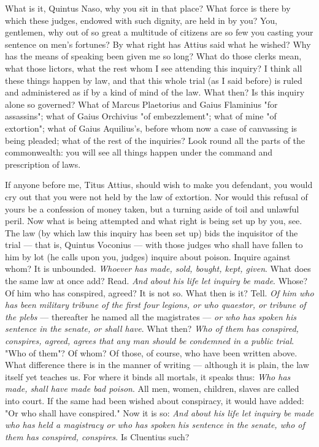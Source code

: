  What is it, Quintus Naso, why you sit in that place? What force is there by which these judges, endowed with such dignity, are held in by you? You, gentlemen, why out of so great a multitude of citizens are so few you casting your sentence on men's fortunes? By what right has Attius said what he wished? Why has the means of speaking been given me so long? What do those clerks mean, what those lictors, what the rest whom I see attending this inquiry? I think all these things happen by law, and that this whole trial (as I said before) is ruled and administered as if by a kind of mind of the law. What then? Is this inquiry alone so governed? What of Marcus Plaetorius and Gaius Flaminius "for assassins"; what of Gaius Orchivius "of embezzlement"; what of mine "of extortion"; what of Gaius Aquilius's, before whom now a case of canvassing is being pleaded; what of the rest of the inquiries? Look round all the parts of the commonwealth: you will see all things happen under the command and prescription of laws.

 If anyone before me, Titus Attius, should wish to make you defendant, you would cry out that you were not held by the law of extortion. Nor would this refusal of yours be a confession of money taken, but a turning aside of toil and unlawful peril. Now what is being attempted and what right is being set up by you, see. The law (by which law this inquiry has been set up) bids the inquisitor of the trial --- that is, Quintus Voconius --- with those judges who shall have fallen to him by lot (he calls upon you, judges) inquire about poison. Inquire against whom? It is unbounded. \textit{Whoever has made, sold, bought, kept, given}. What does the same law at once add? Read. \textit{And about his life let inquiry be made}. Whose? Of him who has conspired, agreed? It is not so. What then is it? Tell. \textit{Of him who has been military tribune of the first four legions, or who quaestor, or tribune of the plebs} --- thereafter he named all the magistrates --- \textit{or who has spoken his sentence in the senate, or shall have}. What then? \textit{Who of them has conspired, conspires, agreed, agrees that any man should be condemned in a public trial}. "Who of them"? Of whom? Of those, of course, who have been written above. What difference there is in the manner of writing --- although it is plain, the law itself yet teaches us. For where it binds all mortals, it speaks thus: \textit{Who has made, shall have made bad poison}. All men, women, children, slaves are called into court. If the same had been wished about conspiracy, it would have added: "Or who shall have conspired." Now it is so: \textit{And about his life let inquiry be made who has held a magistracy or who has spoken his sentence in the senate, who of them has conspired, conspires}. Is Cluentius such?

